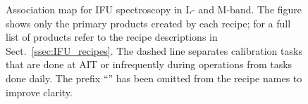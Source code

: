 \begin{landscape}
\begin{figure}[ht]
  \centering
  \resizebox{\linewidth}{!}{}
  \caption[Reduction cascade and association map for IFU spectroscopy]{%
    Association map for \ac{IFU} spectroscopy in L- and M-band. The
    figure shows only the primary products created by each recipe; for
    a full list of products refer to the recipe descriptions in
    Sect.~\ref{ssec:IFU_recipes}. The dashed line separates
    calibration tasks that are done at AIT or infrequently during
    operations from tasks done daily. The prefix ``'' has been
    omitted from the recipe names to improve clarity.}
  \label{Fig:IfuAssomap}
\end{figure}
\end{landscape}
\restoregeometry




